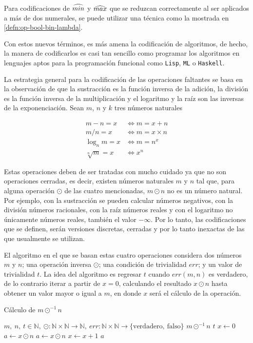 Para codificaciones de \( \widehat{min} \) y \( \widehat{max} \) que se reduzcan correctamente al ser aplicados a más de dos numerales, se puede utilizar una técnica como la mostrada en \ref{defn:op-bool-bin-lambda}.

Con estos nuevos términos, es más amena la codificación de algoritmos, de hecho, la manera de codificarlos es casi tan sencillo como programar los algoritmos en lenguajes aptos para la programación funcional como \texttt{Lisp}, \texttt{ML} o \texttt{Haskell}.

La estrategia general para la codificación de las operaciones faltantes se basa en la observación de que la sustracción es la función inversa de la adición, la división es la función inversa de la multiplicación y el logaritmo y la raíz son las inversas de la exponenciación. Sean \( m \), \( n \) y \( k \) tres números naturales

\begin{align*}
  m-n = x &\iff m = x+n \\
  m/n = x &\iff m = x\times n\\
  \log_{n}m = x &\iff m = n^{x} \\
  \sqrt[n]m = x &\iff x^{n}
\end{align*}

Estas operaciones deben de ser tratadas con mucho cuidado ya que no son operaciones cerradas, es decir, existen números naturales \( m \) y \( n \) tal que, para alguna operación \( \odot \) de las cuatro mencionadas, \( m \odot n \) no es un número natural. Por ejemplo, con la sustracción se pueden calcular números negativos, con la división números racionales, con la raíz números reales y con el logaritmo no únicamente números reales, también el valor \( -\infty \). Por lo tanto, las codificaciones que se definen, serán versiones discretas, cerradas y por lo tanto inexactas de las que usualmente se utilizan.

El algoritmo en el que se basan estas cuatro operaciones considera dos números \( m \) y \( n \); una operación inversa \( \odot \); una condición de trivialidad \( err \); y un valor de trivialidad \( t \). La idea del algoritmo es regresar \( t \) cuando \( err(m,n) \) es verdadero, de lo contrario iterar a partir de \( x = 0 \), calculando el resultado \( x \odot n \) hasta obtener un valor mayor o igual a \( m \), en donde \( x \) será el cálculo de la operación.

\begin{algorithm}
  \caption{Cálculo de \( m \odot^{-1} n \)}
  \label{alg:inversas}
  \begin{algorithmic}
    \REQUIRE \( m,\ n,\ t \in \mathbb{N},\ \odot \colon \mathbb{N} \times \mathbb{N} \to \mathbb{N},\ err \colon \mathbb{N} \times \mathbb{N} \to \{ \mathrm{verdadero},\ \mathrm{falso} \} \)
    \ENSURE \( m \odot^{-1} n \)
    \RETURN \( t \)
    \ELSE
    \STATE \( x \leftarrow 0 \)
    \STATE \( a \leftarrow x \odot n \)
    \STATE \( a \leftarrow x \odot n \)
    \STATE \( x \leftarrow x + 1 \)
    \ENDWHILE
    \RETURN \( a \)
    \ENDIF
  \end{algorithmic}
\end{algorithm}

